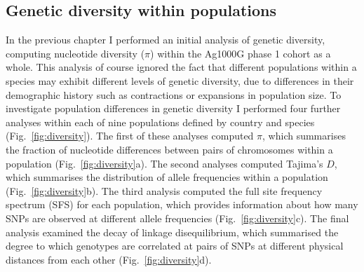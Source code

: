 \documentclass[a4paper,11pt,abstracton,hidelinks]{scrartcl}
\begin{document}
\subsection{Genetic diversity within populations}\label{subsec:diversity}


In the previous chapter I performed an initial analysis of genetic diversity, computing nucleotide diversity ($\pi$) within the Ag1000G phase 1 cohort as a whole.
%
This analysis of course ignored the fact that different populations within a species may exhibit different levels of genetic diversity, due to differences in their demographic history such as contractions or expansions in population size.
%
To investigate population differences in genetic diversity I performed four further analyses within each of nine populations defined by country and species (Fig.~\ref{fig:diversity}).
%
The first of these analyses computed $\pi$, which summarises the fraction of nucleotide differences between pairs of chromosomes within a population (Fig.~\ref{fig:diversity}a).
%
The second analyses computed Tajima's $D$, which summarises the distribution of allele frequencies within a population (Fig.~\ref{fig:diversity}b).
%
The third analysis computed the full site frequency spectrum (SFS) for each population, which provides information about how many SNPs are observed at different allele frequencies (Fig.~\ref{fig:diversity}c).
%
The final analysis examined the decay of linkage disequilibrium, which summarised the degree to which genotypes are correlated at pairs of SNPs at different physical distances from each other (Fig.~\ref{fig:diversity}d).
\end{document}
